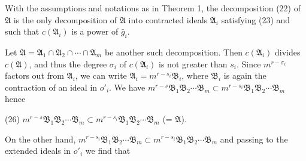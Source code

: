 With the assumptions and notations as in Theorem 1, the decomposition (22) of $\mathfrak{A}$ is the only decomposition of $\mathfrak{A}$ into contracted ideals $\mathfrak{A}_i$ satisfying (23) and such that $c(\mathfrak{A}_i)$ is a power of $\bar{g}_i$.

Let $\mathfrak{A} = \mathfrak{A}_1 \cap \mathfrak{A}_2 \cap \cdots \cap \mathfrak{A}_m$ be another such decomposition. Then $c(\mathfrak{A}_i)$ divides $c(\mathfrak{A})$, and thus the degree $\sigma_i$ of $c(\mathfrak{A}_i)$ is not greater than $s_i$. Since $m^{r-\sigma_i}$ factors out from $\mathfrak{A}_i$, we can write $\mathfrak{A}_i = m^{r-s_i}\mathfrak{B}_i$, where $\mathfrak{B}_i$ is again the contraction of an ideal in $o'_i$. We have $m^{r-s}\mathfrak{B}_1\mathfrak{B}_2 \cdots \mathfrak{B}_m \subset m^{r-s_i}\mathfrak{B}_1\mathfrak{B}_2 \cdots \mathfrak{B}_m$ hence

(26) $m^{r-s}\mathfrak{B}_1\mathfrak{B}_2 \cdots \mathfrak{B}_m \subset m^{r-s_i}\mathfrak{B}_1\mathfrak{B}_2 \cdots \mathfrak{B}_m$ (= $\mathfrak{A}$).

On the other hand, $m^{r-s_i}\mathfrak{B}_1\mathfrak{B}_2 \cdots \mathfrak{B}_m \subset m^{r-s_i}\mathfrak{B}_1\mathfrak{B}_2 \cdots \mathfrak{B}_m$ and passing to the extended ideals in $o'_i$ we find that
